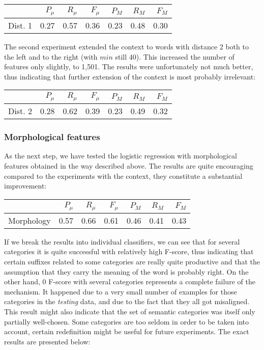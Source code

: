 \documentclass[letterpaper]{article}
\begin{document}
\begin{table}[h]

\begin{tabular}{|r|r|r|r|r|r|r|}
 \hline
 & $P_\mu$ & $R_\mu$ & $F_\mu$ & $P_M$ & $R_M$  & $F_M$ \\ \hline
Dist. 1 & 0.27 & 0.57 & 0.36 & 0.23 & 0.48 & 0.30 \\ \hline
\end{tabular}
\end{table}

The second experiment extended the context to words with distance 2 both to the left and to the right 
(with $min$ still 40). This increased the number of features only slightly, to 1,501. The results were unfortunately not much better, thus indicating that further extension of the context is most probably irrelevant:

\begin{table}[h]
\begin{tabular}{|r|r|r|r|r|r|r|}
 \hline
 & $P_\mu$ & $R_\mu$ & $F_\mu$ & $P_M$ & $R_M$  & $F_M$ \\ \hline
Dist. 2 & 0.28 & 0.62 & 0.39 & 0.23 & 0.49 & 0.32 \\ \hline
\end{tabular}
\end{table}



\subsubsection{Morphological features}
As the next step, we have tested the logistic regression with morphological features obtained in the way described above. The results are quite encouraging compared to the experiments with the context, they constitute a substantial improvement:

\begin{table}[h]
\begin{tabular}{|r|r|r|r|r|r|r|}
 \hline
 & $P_\mu$ & $R_\mu$ & $F_\mu$ & $P_M$ & $R_M$  & $F_M$ \\ \hline
Morphology & 0.57 & 0.66 & 0.61 & 0.46 & 0.41 & 0.43 \\ \hline
\end{tabular}

\end{table}

If we break the results into individual classifiers, we can see that for several categories it is quite successful with relatively high F-score, thus indicating that certain suffixes related to some categories are really quite productive and that the assumption that they carry the meaning of the word is probably right. On the other hand, 0 F-score with several categories represents a complete failure of the mechanism. It happened due to a very small number of examples for those categories in the \emph{testing} data, and due to the fact that they all got misaligned. This result might also indicate that the set of semantic categories was itself only partially well-chosen. Some categories are too seldom in order to be taken into account, certain redefinition might be useful for future experiments. The exact results are presented below: 
\end{document}
